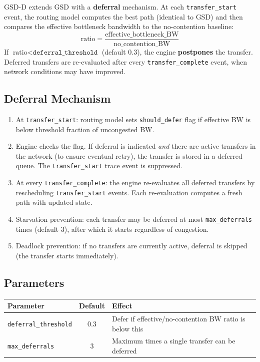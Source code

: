 \documentclass[11pt]{article}
\begin{document}
\medskip
GSD-D extends GSD with a \textbf{deferral} mechanism.  At each
\texttt{transfer\_start} event, the routing model computes the best path
(identical to GSD) and then compares the effective bottleneck bandwidth to
the no-contention baseline:
\[
  \text{ratio} = \frac{\text{effective\_bottleneck\_BW}}{\text{no\_contention\_BW}}
\]
If $\text{ratio} < \texttt{deferral\_threshold}$ (default 0.3), the engine
\textbf{postpones} the transfer.  Deferred transfers are re-evaluated after
every \texttt{transfer\_complete} event, when network conditions may have
improved.

\subsection{Deferral Mechanism}

\begin{enumerate}
\item At \texttt{transfer\_start}: routing model sets \texttt{should\_defer}
      flag if effective BW is below threshold fraction of uncongested BW.
\item Engine checks the flag.  If deferral is indicated \emph{and} there are
      active transfers in the network (to ensure eventual retry), the transfer
      is stored in a deferred queue.  The \texttt{transfer\_start} trace event
      is suppressed.
\item At every \texttt{transfer\_complete}: the engine re-evaluates all
      deferred transfers by rescheduling \texttt{transfer\_start} events.
      Each re-evaluation computes a fresh path with updated state.
\item Starvation prevention: each transfer may be deferred at most
      \texttt{max\_deferrals} times (default 3), after which it starts
      regardless of congestion.
\item Deadlock prevention: if no transfers are currently active, deferral is
      skipped (the transfer starts immediately).
\end{enumerate}

\subsection{Parameters}

\begin{tabular}{@{}lcp{7cm}@{}}
\toprule
\textbf{Parameter} & \textbf{Default} & \textbf{Effect} \\
\midrule
\texttt{deferral\_threshold} & 0.3 & Defer if effective/no-contention BW ratio is below this \\
\texttt{max\_deferrals}      & 3   & Maximum times a single transfer can be deferred \\
\bottomrule
\end{tabular}
\end{document}
